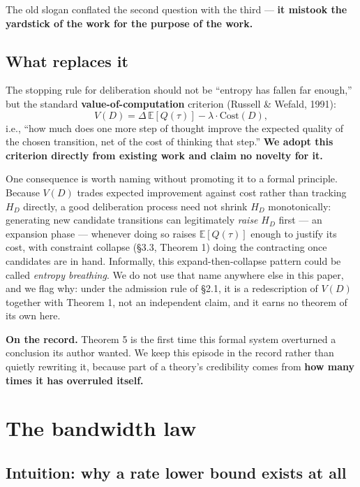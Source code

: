 \documentclass[11pt]{article}
\renewenvironment{quote}
  {\def\FrameCommand{{\color{gray!60}\vrule width 2pt}\hspace{8pt}}%
   \MakeFramed{\advance\hsize-\width \FrameRestore}\begin{itshape}}
  {\end{itshape}\endMakeFramed}
\begin{document}
The old slogan conflated the second question with the third --- \textbf{it mistook the yardstick of the work for the purpose of the work.}

\hypertarget{what-replaces-it}{%
\subsection{What replaces it}\label{what-replaces-it}}

The stopping rule for deliberation should not be ``entropy has fallen far enough,'' but the standard \textbf{value-of-computation} criterion (Russell \& Wefald, 1991):
\[V(D)=\Delta\,\mathbb E[Q(\tau)]-\lambda\cdot\mathrm{Cost}(D),\]
i.e., ``how much does one more step of thought improve the expected quality of the chosen transition, net of the cost of thinking that step.'' \textbf{We adopt this criterion directly from existing work and claim no novelty for it.}

One consequence is worth naming without promoting it to a formal principle. Because \(V(D)\) trades expected improvement against cost rather than tracking \(H_D\) directly, a good deliberation process need not shrink \(H_D\) monotonically: generating new candidate transitions can legitimately \emph{raise} \(H_D\) first --- an expansion phase --- whenever doing so raises \(\mathbb E[Q(\tau)]\) enough to justify its cost, with constraint collapse (\S{}3.3, Theorem 1) doing the contracting once candidates are in hand. Informally, this expand-then-collapse pattern could be called \emph{entropy breathing}. We do not use that name anywhere else in this paper, and we flag why: under the admission rule of \S{}2.1, it is a redescription of \(V(D)\) together with Theorem 1, not an independent claim, and it earns no theorem of its own here.

\begin{quote}
\textbf{On the record.} Theorem 5 is the first time this formal system overturned a conclusion its author wanted. We keep this episode in the record rather than quietly rewriting it, because part of a theory's credibility comes from \textbf{how many times it has overruled itself.}
\end{quote}

\hypertarget{the-bandwidth-law}{%
\section{The bandwidth law}\label{the-bandwidth-law}}

\hypertarget{intuition-why-a-rate-lower-bound-exists-at-all}{%
\subsection{Intuition: why a rate lower bound exists at all}\label{intuition-why-a-rate-lower-bound-exists-at-all}}
\end{document}
